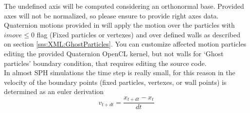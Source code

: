 %
The undefined axis will be computed considering an orthonormal base. Provided axes will not be normalized, so
please ensure to provide right axes data.\\
%
Quaternion motions provided in \NAME will apply the motion over the particles with $imove \le 0$ flag (Fixed
particles or vertexes) and over defined walls as described on section \ref{sss:XML:GhostParticles}. You can
customize affected motion particles editing the provided Quaternion OpenCL kernel, but not walls for `Ghost
particles' boundary condition, that requires editing the \NAME source code.\\
%
In almost SPH simulations the time step is really small, for this reason in \NAME the velocity of the boundary
points (fixed particles, vertexes, or wall points) is determined as an euler derivation
%
\[v_{t+dt} = \frac{x_{t+dt} - x_t}{dt}\]
%